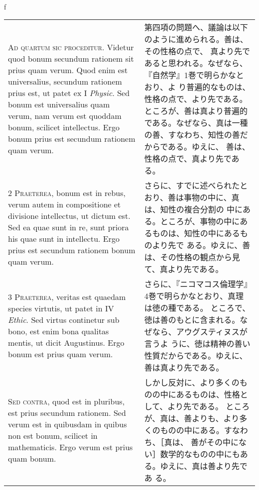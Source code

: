 \\f\documentclass[10pt]{jsarticle} %
\begin{document}
\begin{longtable}{p{21em}p{21em}}

{\huge A}{\scshape d quartum sic proceditur}. Videtur quod bonum
secundum rationem sit prius quam verum. Quod enim est universalius,
secundum rationem prius est, ut patet ex I {\itshape Physic}. Sed
bonum est universalius quam verum, nam verum est quoddam bonum,
scilicet intellectus. Ergo bonum prius est secundum rationem quam
verum.

&

 第四項の問題へ、議論は以下のように進められる。善は、その性格の点で、
真より先であると思われる。なぜなら、『自然学』1巻で明らかなとおり、よ
り普遍的なものは、性格の点で、より先である。ところが、善は真より普遍的
である。なぜなら、真は一種の善、すなわち、知性の善だからである。ゆえに、
善は、性格の点で、真より先である。

\\


{\scshape 2 Praeterea}, bonum est in rebus, verum autem in
compositione et divisione intellectus, ut dictum est. Sed ea quae sunt
in re, sunt priora his quae sunt in intellectu. Ergo prius est
secundum rationem bonum quam verum.

&

さらに、すでに述べられたとおり、善は事物の中に、真は、知性の複合分割の
 中にある。ところが、事物の中にあるものは、知性の中にあるものより先で
 ある。ゆえに、善は、その性格の観点から見て、真より先である。

\\


{\scshape 3 Praeterea}, veritas est quaedam species virtutis, ut patet
in IV {\itshape Ethic}. Sed virtus continetur sub bono, est enim bona
qualitas mentis, ut dicit Augustinus. Ergo bonum est prius quam verum.

&


 さらに、『ニコマコス倫理学』4巻で明らかなとおり、真理は徳の種である。
 ところで、徳は善のもとに含まれる。なぜなら、アウグスティヌスが言うよ
 うに、徳は精神の善い性質だからである。ゆえに、善は真より先である。


\\


{\scshape Sed contra}, quod est in pluribus, est prius secundum
rationem. Sed verum est in quibusdam in quibus non est bonum, scilicet
in mathematicis. Ergo verum est prius quam bonum.

&

しかし反対に、より多くのものの中にあるものは、性格として、より先である。
 ところが、真は、善よりも、より多くのものの中にある。すなわち、［真は、
 善がその中にない］数学的なものの中にもある。ゆえに、真は善より先であ
 る。


\end{longtable}
\end{document}
